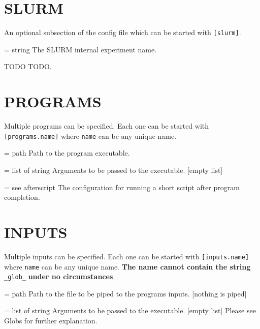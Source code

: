 \documentclass[a4paper,english]{article}
\begin{document}
    \section{SLURM}

      An optional subsection of the config file which can be started with \texttt{[slurm]}.

      \begin{Description}[Options]\setlength{\itemsep}{0cm}
          \item[\Opt{experiment\_name} = string] The SLURM internal experiment name.
          \item[TODO] TODO.
      \end{Description}


    \section{PROGRAMS}

      Multiple programs can be specified. Each one can be started with \texttt{[programs.name]} where \texttt{name} can be any unique name.

      \begin{Description}[Options]\setlength{\itemsep}{0cm}
          \item[\Opt{binary} = path] Path to the program executable.
          \item[\oOpt{arguments} = list of string] Arguments to be passed to the executable. [empty list]
          \item[\oOpt{afterscript} = see afterscript] The configuration for running a short script after program completion.
      \end{Description}

    \section{INPUTS}

      Multiple inputs can be specified. Each one can be started with \texttt{[inputs.name]} where \texttt{name} can be any unique name.
      \textbf{The name cannot contain the string} \texttt{\_glob\_} \textbf{under no circumstances}

      \begin{Description}[Options]\setlength{\itemsep}{0cm}
          \item[\oOpt{input} = path] Path to the file to be piped to the programs inputs. [nothing is piped]
          \item[\oOpt{arguments} = list of string] Arguments to be passed to the executable. [empty list]
            Please see Globs for further explanation.
      \end{Description}
\end{document}
